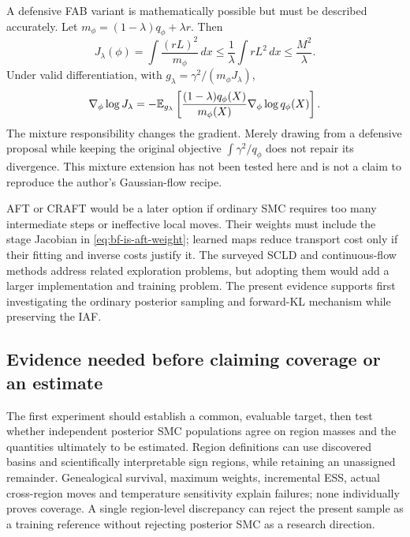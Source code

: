 A defensive FAB variant is mathematically possible but must be described
accurately. Let $m_\phi=(1-\lambda)q_\phi+\lambda r$. Then
\begin{equation}
 J_\lambda(\phi)=\int\frac{(rL)^2}{m_\phi}\,dx
 \le\frac1\lambda\int rL^2\,dx\le\frac{M^2}{\lambda}.
 \label{eq:bf-is-defensive-fab}
\end{equation}
Under valid differentiation, with $g_\lambda=\gamma^2/(m_\phi J_\lambda)$,
\begin{equation}
 \nabla_\phi\log J_\lambda
 =-\mathbb{E}_{g_\lambda}\left[
 \frac{(1-\lambda)q_\phi(X)}{m_\phi(X)}
 \nabla_\phi\log q_\phi(X)\right].
 \label{eq:bf-is-defensive-fab-gradient}
\end{equation}
The mixture responsibility changes the gradient. Merely drawing from a
defensive proposal while keeping the original objective $\int\gamma^2/q_\phi$
does not repair its divergence. This mixture extension has not been tested
here and is not a claim to reproduce the author's Gaussian-flow recipe.

AFT or CRAFT would be a later option if ordinary SMC requires too many
intermediate steps or ineffective local moves. Their weights must include
the stage Jacobian in \eqref{eq:bf-is-aft-weight}; learned maps reduce
transport cost only if their fitting and inverse costs justify it. The
surveyed SCLD and continuous-flow methods address related exploration
problems, but adopting them would add a larger implementation and training
problem. The present evidence supports first investigating the ordinary
posterior sampling and forward-KL mechanism while preserving the IAF.

\subsection{Evidence needed before claiming coverage or an estimate}

The first experiment should establish a common, evaluable target, then test
whether independent posterior SMC populations agree on region masses and
the quantities ultimately to be estimated. Region definitions can use
discovered basins and scientifically interpretable sign regions, while
retaining an unassigned remainder. Genealogical survival, maximum weights,
incremental ESS, actual cross-region moves and temperature sensitivity explain
failures; none individually proves coverage. A single region-level discrepancy
can reject the present sample as a training reference without rejecting
posterior SMC as a research direction.

